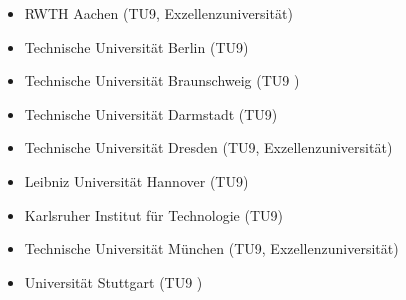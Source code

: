 \documentclass[11pt]{article}
\begin{document}
\begin{itemize}
\item RWTH Aachen (TU9, Exzellenzuniversität)
\item Technische Universität Berlin (TU9)
\item Technische Universität Braunschweig (TU9 )
\item Technische Universität Darmstadt (TU9)
\item Technische Universität Dresden (TU9, Exzellenzuniversität)
\item Leibniz Universität Hannover (TU9)
\item Karlsruher Institut für Technologie (TU9)
\item Technische Universität München (TU9, Exzellenzuniversität)
\item Universität Stuttgart (TU9 )
\end{itemize}
\end{document}
